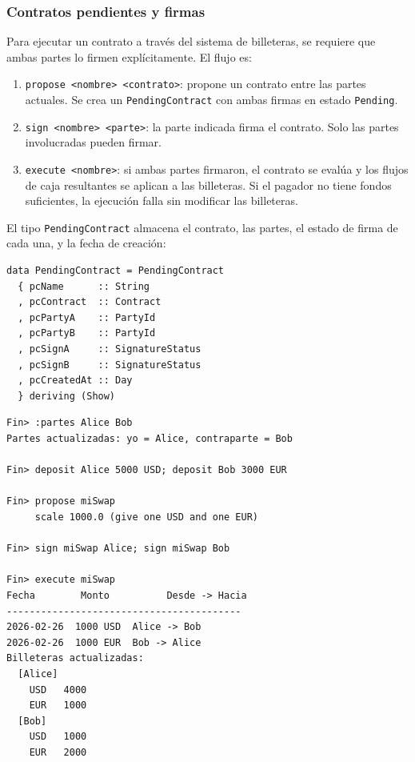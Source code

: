 \documentclass[a4paper, 12pt]{article}
\begin{document}
\subsubsection{Contratos pendientes y firmas}

Para ejecutar un contrato a través del sistema de billeteras, se requiere que ambas partes lo firmen explícitamente. El flujo es:

\begin{enumerate}[nosep]
    \item \texttt{propose <nombre> <contrato>}: propone un contrato entre las partes actuales. Se crea un \texttt{PendingContract} con ambas firmas en estado \texttt{Pending}.
    \item \texttt{sign <nombre> <parte>}: la parte indicada firma el contrato. Solo las partes involucradas pueden firmar.
    \item \texttt{execute <nombre>}: si ambas partes firmaron, el contrato se evalúa y los flujos de caja resultantes se aplican a las billeteras. Si el pagador no tiene fondos suficientes, la ejecución falla sin modificar las billeteras.
\end{enumerate}

El tipo \texttt{PendingContract} almacena el contrato, las partes, el estado de firma de cada una, y la fecha de creación:

\begin{lstlisting}[caption={Contrato pendiente (PendingContracts.hs)}]
data PendingContract = PendingContract
  { pcName      :: String
  , pcContract  :: Contract
  , pcPartyA    :: PartyId
  , pcPartyB    :: PartyId
  , pcSignA     :: SignatureStatus
  , pcSignB     :: SignatureStatus
  , pcCreatedAt :: Day
  } deriving (Show)
\end{lstlisting}

\begin{lstlisting}[style=replstyle, numbers=none, caption={Sesión con billeteras y firmas}]
Fin> :partes Alice Bob
Partes actualizadas: yo = Alice, contraparte = Bob

Fin> deposit Alice 5000 USD; deposit Bob 3000 EUR

Fin> propose miSwap
     scale 1000.0 (give one USD and one EUR)

Fin> sign miSwap Alice; sign miSwap Bob

Fin> execute miSwap
Fecha        Monto          Desde -> Hacia
-----------------------------------------
2026-02-26  1000 USD  Alice -> Bob
2026-02-26  1000 EUR  Bob -> Alice
Billeteras actualizadas:
  [Alice]
    USD   4000
    EUR   1000
  [Bob]
    USD   1000
    EUR   2000
\end{lstlisting}
\end{document}
